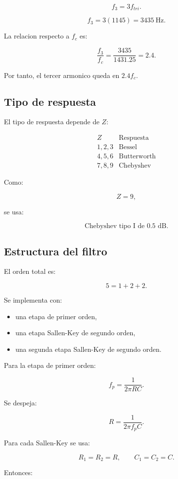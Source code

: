 \documentclass[11pt,letterpaper]{article}
\begin{document}
\[
f_3=3f_{tri}.
\]

\[
f_3=3(1145)=3435~\text{Hz}.
\]

La relacion respecto a \(f_c\) es:

\[
\frac{f_3}{f_c}
=
\frac{3435}{1431.25}
=2.4.
\]

Por tanto, el tercer armonico queda en \(2.4f_c\).

\subsection{Tipo de respuesta}

El tipo de respuesta depende de \(Z\):

\[
\begin{array}{c|c}
Z & \text{Respuesta} \\
\hline
1,2,3 & \text{Bessel}\\
4,5,6 & \text{Butterworth}\\
7,8,9 & \text{Chebyshev}
\end{array}
\]

Como:

\[
Z=9,
\]

se usa:

\[
\boxed{\text{Chebyshev tipo I de 0.5 dB}}.
\]

\subsection{Estructura del filtro}

El orden total es:

\[
5=1+2+2.
\]

Se implementa con:

\begin{itemize}
  \item una etapa de primer orden,
  \item una etapa Sallen-Key de segundo orden,
  \item una segunda etapa Sallen-Key de segundo orden.
\end{itemize}

Para la etapa de primer orden:

\[
f_p=\frac{1}{2\pi RC}.
\]

Se despeja:

\[
R=\frac{1}{2\pi f_p C}.
\]

Para cada Sallen-Key se usa:

\[
R_1=R_2=R,
\qquad
C_1=C_2=C.
\]

Entonces:
\end{document}
